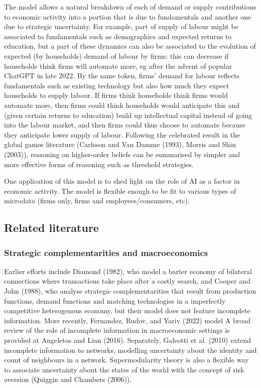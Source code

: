 \documentclass[
]{article}
\theoremstyle{definition}
\theoremstyle{plain}
\theoremstyle{remark}
\begin{document}
The model allows a natural breakdown of each of demand or supply
contributions to economic activity into a portion that is due to
fundamentals and another one due to strategic uncertainty. For example,
part of supply of labour might be associated to fundamentals such as
demographics and expected returns to education, but a part of these
dynamics can also be associated to the evolution of expected (by
households) demand of labour by firms; this can decrease if households
think firms will automate more, eg after the advent of popular ChatGPT
in late 2022. By the same token, firms' demand for labour reflects
fundamentals such as existing technology but also how much they expect
households to supply labour. If firms think households think firms would
automate more, then firms could think households would anticipate this
and (given certain returns to education) build up intellectual capital
instead of going into the labour market, and then firms could thus
choose to automate because they anticipate lower supply of labour.
Following the celebrated result in the global games literature (Carlsson
and Van Damme (1993), Morris and Shin (2003)), reasoning on higher-order
beliefs can be summarised by simpler and more effective forms of
reasoning such as threshold strategies.

One application of this model is to shed light on the role of AI as a
factor in economic activity. The model is flexible enough to be fit to
various types of microdata (firms only, firms and employees/consumers,
etc).

\subsection{Related literature}\label{related-literature}

\subsubsection{Strategic complementarities and
macroeconomics}\label{strategic-complementarities-and-macroeconomics}

Earlier efforts include Diamond (1982), who model a barter economy of
bilateral connections where transactions take place after a costly
search, and Cooper and John (1988), who analyse strategic
complementarities that result from production functions, demand
functions and matching technologies in a imperfectly competitive
heterogenous economy, but their model does not feature incomplete
information. More recently, Fernandez, Rudov, and Yariv (2022) model A
broad review of the role of incomplete information in macroeconomic
settings is provided at Angeletos and Lian (2016). Separately, Galeotti
et al. (2010) extend incomplete information to networks, modelling
uncertainty about the identity and count of neighbours in a network.
Supermodularity theory is also a flexible way to associate uncertainty
about the states of the world with the concept of risk aversion (Quiggin
and Chambers (2006)).
\end{document}
